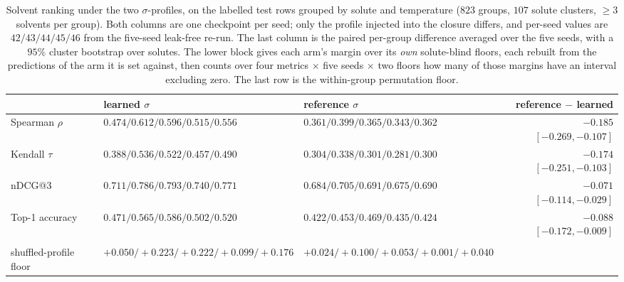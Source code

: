 \begin{table}[t]
\centering
\caption[Solvent ranking under the two profiles]{Solvent ranking under the two $\sigma$-profiles, on the labelled test rows grouped by
solute and temperature ($823$ groups, $107$ solute clusters, $\ge3$ solvents per group). Both
columns are one checkpoint per seed; only the profile injected into the closure differs, and
per-seed values are $42/43/44/45/46$ from the five-seed leak-free re-run. The last column is the
paired per-group difference averaged over
the five seeds, with a $95\%$ cluster bootstrap over solutes. The lower block gives each arm's
margin over its \emph{own} solute-blind floors, each rebuilt from the predictions of the arm it is
set against, then counts over four metrics $\times$ five seeds $\times$ two floors how many of
those margins have an interval excluding zero. The last row is the within-group permutation floor.}
\label{tab:ranking}
{\scriptsize
\setlength{\tabcolsep}{3pt}
\begin{tabular}{lllr}
\toprule
 & learned $\sigma$ & reference $\sigma$ & reference $-$ learned \\
\midrule
Spearman $\rho$   & $0.474/0.612/0.596/0.515/0.556$ & $0.361/0.399/0.365/0.343/0.362$ & $-0.185$ $[-0.269,-0.107]$ \\
Kendall $\tau$    & $0.388/0.536/0.522/0.457/0.490$ & $0.304/0.338/0.301/0.281/0.300$ & $-0.174$ $[-0.251,-0.103]$ \\
nDCG@3            & $0.711/0.786/0.793/0.740/0.771$ & $0.684/0.705/0.691/0.675/0.690$ & $-0.071$ $[-0.114,-0.029]$ \\
Top-1 accuracy    & $0.471/0.565/0.586/0.502/0.520$ & $0.422/0.453/0.469/0.435/0.424$ & $-0.088$ $[-0.172,-0.009]$ \\
\addlinespace[3pt]
\multicolumn{4}{@{}l@{}}{\emph{Margin over its own solute-blind floor} ($\rho$)}\\
shuffled-profile floor    & $+0.050/{+}0.223/{+}0.222/{+}0.099/{+}0.176$ & $+0.024/{+}0.100/{+}0.053/{+}0.001/{+}0.040$ & \\

\end{tabular}}
\end{table}
